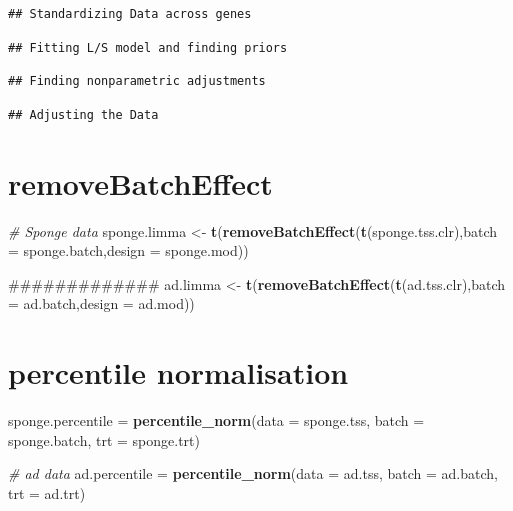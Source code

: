 \documentclass[]{book}
\newenvironment{Shaded}{\begin{snugshade}}{\end{snugshade}}
\newcommand{\KeywordTok}[1]{\textcolor[rgb]{0.13,0.29,0.53}{\textbf{#1}}}
\newcommand{\DataTypeTok}[1]{\textcolor[rgb]{0.13,0.29,0.53}{#1}}
\newcommand{\StringTok}[1]{\textcolor[rgb]{0.31,0.60,0.02}{#1}}
\newcommand{\CommentTok}[1]{\textcolor[rgb]{0.56,0.35,0.01}{\textit{#1}}}
\newcommand{\NormalTok}[1]{#1}
\begin{document}
\begin{verbatim}
## Standardizing Data across genes
\end{verbatim}

\begin{verbatim}
## Fitting L/S model and finding priors
\end{verbatim}

\begin{verbatim}
## Finding nonparametric adjustments
\end{verbatim}

\begin{verbatim}
## Adjusting the Data
\end{verbatim}

\section{removeBatchEffect}\label{removebatcheffect}

\begin{Shaded}
\begin{Highlighting}[]
\CommentTok{# Sponge data}
\NormalTok{sponge.limma <-}\StringTok{ }\KeywordTok{t}\NormalTok{(}\KeywordTok{removeBatchEffect}\NormalTok{(}\KeywordTok{t}\NormalTok{(sponge.tss.clr),}\DataTypeTok{batch =}\NormalTok{ sponge.batch,}\DataTypeTok{design =}\NormalTok{ sponge.mod))}

\NormalTok{#############}
\NormalTok{ad.limma <-}\StringTok{ }\KeywordTok{t}\NormalTok{(}\KeywordTok{removeBatchEffect}\NormalTok{(}\KeywordTok{t}\NormalTok{(ad.tss.clr),}\DataTypeTok{batch =}\NormalTok{ ad.batch,}\DataTypeTok{design =}\NormalTok{ ad.mod))}
\end{Highlighting}
\end{Shaded}

\section{percentile normalisation}\label{percentile-normalisation}

\begin{Shaded}
\begin{Highlighting}[]
\NormalTok{sponge.percentile =}\StringTok{ }\KeywordTok{percentile_norm}\NormalTok{(}\DataTypeTok{data =}\NormalTok{ sponge.tss, }\DataTypeTok{batch =}\NormalTok{ sponge.batch, }\DataTypeTok{trt =}\NormalTok{ sponge.trt)}

\CommentTok{# ad data}
\NormalTok{ad.percentile =}\StringTok{ }\KeywordTok{percentile_norm}\NormalTok{(}\DataTypeTok{data =}\NormalTok{ ad.tss, }\DataTypeTok{batch =}\NormalTok{ ad.batch, }\DataTypeTok{trt =}\NormalTok{ ad.trt)}
\end{Highlighting}
\end{Shaded}
\end{document}
